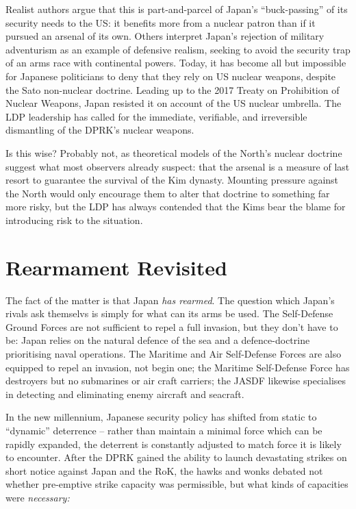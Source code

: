 \documentclass[letterpaper,12pt,twoside]{article} %
\begin{document}
\begin{multicols}{2}
Realist authors argue that this is part-and-parcel of Japan's ``buck-passing'' of its security needs to the US: it benefits more from a nuclear patron than if it pursued an arsenal of its own.\autocite{izumikawa2010antimilitarism}\autocite{lind2004pacifism} Others interpret Japan's rejection of military adventurism as an example of defensive realism, seeking to avoid the security trap of an arms race with continental powers. Today, it has become all but impossible for Japanese politicians to deny that they rely on US nuclear weapons, despite the Sato non-nuclear doctrine. Leading up to the 2017 Treaty on Prohibition of Nuclear Weapons, Japan resisted it on account of the US nuclear umbrella. The LDP leadership has called for the immediate, verifiable, and irreversible dismantling of the DPRK's nuclear weapons.

Is this wise? Probably not, as theoretical models of the North's nuclear doctrine suggest what most observers already suspect: that the arsenal is a measure of last resort to guarantee the survival of the Kim dynasty.\autocite{lee2020dprk} Mounting pressure against the North would only encourage them to alter that doctrine to something far more risky, but the LDP has always contended that the Kims bear the blame for introducing risk to the situation.

\section{Rearmament Revisited}

The fact of the matter is that Japan \textit{has rearmed}. The question which Japan's rivals ask themselvs is simply for what can its arms be used. The Self-Defense Ground Forces are not sufficient to repel a full invasion, but they don't have to be: Japan relies on the natural defence of the sea and a defence-doctrine prioritising naval operations. The Maritime and Air Self-Defense Forces are also equipped to repel an invasion, not begin one; the Maritime Self-Defense Force has destroyers but no submarines or air craft carriers; the JASDF likewise specialises in detecting and eliminating enemy aircraft and seacraft.

In the new millennium, Japanese security policy has shifted from static to ``dynamic'' deterrence -- rather than maintain a minimal force which can be rapidly expanded, the deterrent is constantly adjusted to match force it is likely to encounter. After the DPRK gained the ability to launch devastating strikes on short notice against Japan and the RoK, the hawks and wonks debated not whether pre-emptive strike capacity was permissible, but what kinds of capacities were \textit{necessary:}


\end{multicols}
\end{document}
